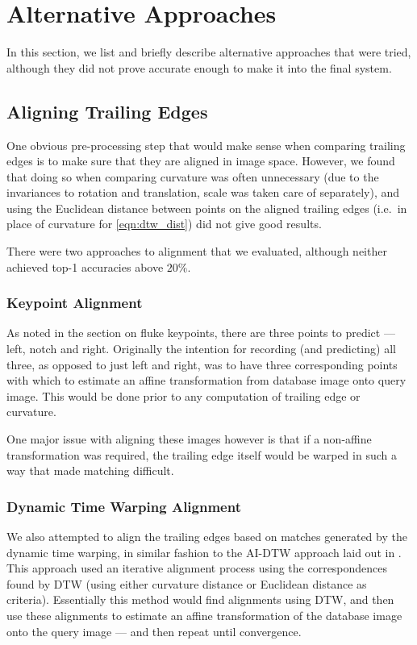 \section{Alternative Approaches}

In this section, we list and briefly describe alternative approaches that were tried, although they did not prove accurate enough to make it into the final system.

\subsection{Aligning Trailing Edges}

One obvious pre-processing step that would make sense when comparing trailing edges is to make sure that they are aligned in image space.
However, we found that doing so when comparing curvature was often unnecessary (due to the invariances to rotation and translation, scale was taken care of separately), and using the Euclidean distance between points on the aligned trailing edges (i.e.\ in place of curvature for \eqref{eqn:dtw_dist}) did not give good results.

There were two approaches to alignment that we evaluated, although neither achieved top-1 accuracies above $20\%$.

\subsubsection{Keypoint Alignment}

As noted in the section on fluke keypoints, there are three points to predict --- left, notch and right.
Originally the intention for recording (and predicting) all three, as opposed to just left and right, was to have three corresponding points with which to estimate an affine transformation from database image onto query image.
This would be done prior to any computation of trailing edge or curvature.

One major issue with aligning these images however is that if a non-affine transformation was required, the trailing edge itself would be warped in such a way that made matching difficult.

\subsubsection{Dynamic Time Warping Alignment}

We also attempted to align the trailing edges based on matches generated by the dynamic time warping, in similar fashion to the AI-DTW approach laid out in \cite{qiao2006affine}.
This approach used an iterative alignment process using the correspondences found by DTW (using either curvature distance or Euclidean distance as criteria).
Essentially this method would find alignments using DTW, and then use these alignments to estimate an affine transformation of the database image onto the query image --- and then repeat until convergence.


